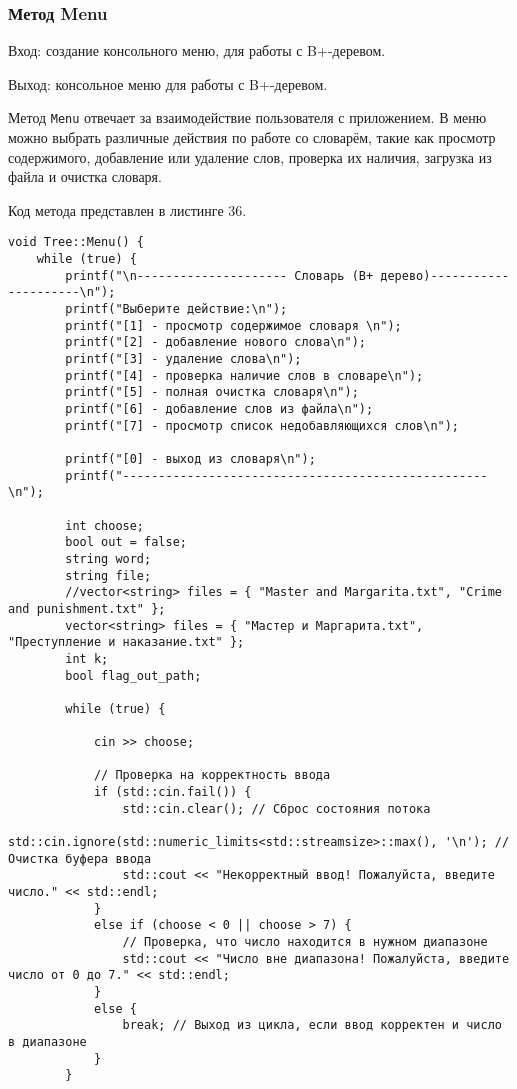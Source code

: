 \documentclass[10pt,a4paper,final]{article} %
\begin{document}
\subsubsection{Метод Menu}
Вход: создание консольного меню, для работы с B+-деревом. \par
Выход: консольное меню для работы с B+-деревом. \par
\par Метод \texttt{Menu} отвечает за взаимодействие пользователя с приложением. В меню можно выбрать различные действия по работе со словарём, такие как просмотр содержимого, добавление или удаление слов, проверка их наличия, загрузка из файла и очистка словаря.

Код метода представлен в листинге 36. \begin{lstlisting}[label=menuMethod, caption = Метод Menu для класса Tree] 
void Tree::Menu() {
	while (true) {
		printf("\n--------------------- Словарь (В+ дерево)---------------------\n");
		printf("Выберите действие:\n");
		printf("[1] - просмотр содержимое словаря \n");
		printf("[2] - добавление нового слова\n");
		printf("[3] - удаление слова\n");
		printf("[4] - проверка наличие слов в словаре\n");
		printf("[5] - полная очистка словаря\n");
		printf("[6] - добавление слов из файла\n");
		printf("[7] - просмотр список недобавляющихся слов\n");
		
		printf("[0] - выход из словаря\n");
		printf("---------------------------------------------------\n");
		
		int choose;
		bool out = false;
		string word;
		string file;
		//vector<string> files = { "Master and Margarita.txt", "Crime and punishment.txt" };
		vector<string> files = { "Мастер и Маргарита.txt", "Преступление и наказание.txt" };
		int k;
		bool flag_out_path;
		
		while (true) {
			
			cin >> choose;
			
			// Проверка на корректность ввода
			if (std::cin.fail()) {
				std::cin.clear(); // Сброс состояния потока
				std::cin.ignore(std::numeric_limits<std::streamsize>::max(), '\n'); // Очистка буфера ввода
				std::cout << "Некорректный ввод! Пожалуйста, введите число." << std::endl;
			}
			else if (choose < 0 || choose > 7) {
				// Проверка, что число находится в нужном диапазоне
				std::cout << "Число вне диапазона! Пожалуйста, введите число от 0 до 7." << std::endl;
			}
			else {
				break; // Выход из цикла, если ввод корректен и число в диапазоне
			}
		}
		

\end{lstlisting}
\end{document}
